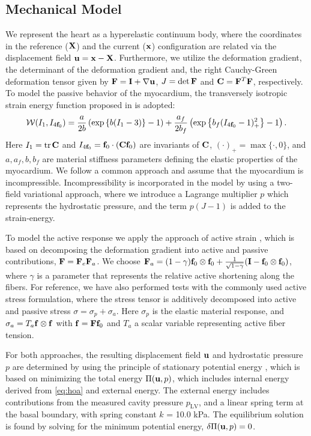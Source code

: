 \subsection{Mechanical Model}
We represent the heart as a hyperelastic continuum body, where the coordinates in
the reference ($\mathbf{X}$) and the current ($\mathbf{x}$) configuration are
related via the displacement field $\mathbf{u} = \mathbf{x}-\mathbf{X}$. Furthermore,
we utilize the
deformation gradient, the determinant of the deformation gradient
and, the right Cauchy-Green deformation tensor given by $\mathbf{F}= \mathbf{I}+\nabla
\mathbf{u} $,  $J = \det \mathbf{F}$ and $\mathbf{C} = \mathbf{F}^T\mathbf{F}$, respectively. 
To model the passive behavior of the myocardium, the transversely 
isotropic strain energy function proposed in  \cite{holzapfel2009constitutive} is adopted:
\begin{align}
\label{eq:hoa}
  \mathcal{W}(I_1, I_{4\mathbf{f}_0}) = \frac{a}{2 b} \left( \exp\left\{ b (I_1 
  - 3)\right\}  -1 \right)
  + \frac{a_f}{2 b_f} \left( \exp\left\{ b_f (I_{4\mathbf{f}_0} 
  - 1)_+^2\right\} -1 \right).
\end{align}
Here $I_1 = \mathrm{tr} \hspace{0.05cm} \mathbf{C}$ and $I_{4\mathbf{f}_0}= \mathbf{f}_0 \cdot (\mathbf{C} \mathbf{f}_0)$ are invariants
of $\mathbf{C}$, $(\cdotp)_{+}  = \max\{\cdot, 0\}$, and $a, a_f, b, b_f$ are
material stiffness parameters defining the elastic properties of the myocardium.
We follow a common approach and assume that the myocardium is incompressible. 
Incompressibility is incorporated in the model by using a two-field variational 
approach, where we introduce a Lagrange multiplier $p$ which represents the 
hydrostatic pressure, and the term $p(J-1)$ is added to the strain-energy.

To model the active response we apply the approach of active strain
\cite{ambrosi2012active}, which is based on decomposing
the deformation gradient into active and passive contributions, $\mathbf{F} =
\mathbf{F}_e \mathbf{F}_a$. We choose $\mathbf{F}_a = (1 - \gamma) \mathbf{f}_0 \otimes \mathbf{f}_0 +
\frac{1}{\sqrt{1 - \gamma}} (\mathbf{I} - \mathbf{f}_0 \otimes \mathbf{f}_0)$, where $\gamma$
is a parameter that represents the relative active shortening along
the fibers. For reference, we have also performed tests with the
commonly used active stress formulation, where the stress tensor 
is additively decomposed into active and passive stress $\sigma =
\sigma_p + \sigma_a$. Here $\sigma_p$ is
the elastic material response, and $\sigma_a = T_a \mathbf{f} \otimes \mathbf{f}$ with
$\mathbf{f} = \mathbf{F}\mathbf{f}_0$ and $T_a$ a scalar variable representing active fiber
tension.


For both approaches, the resulting displacement field $\mathbf{u}$ and hydrostatic pressure $p$
are determined by using the principle of stationary potential energy
\cite{holzapfel2000nonlinear}, which is based on minimizing the total
energy  $\Pi(\mathbf{u}, p)$, which includes internal energy derived from
\eqref{eq:hoa} and external energy. The external energy includes
contributions from the measured cavity pressure $p_{\text{LV}}$, and a
linear spring term at the basal boundary, with spring constant
$k$ = 10.0 kPa. The equilibrium solution is found by solving for the minimum
potential energy, $\delta\Pi(\mathbf{u}, p) = 0$. 

